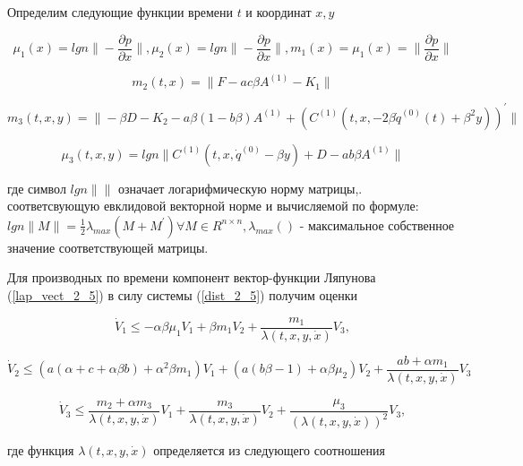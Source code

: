 Определим следующие функции времени $t$ и координат $x, y$

\begin{equation}
\mu_1 (x) = lgn \| - \frac{\partial p}{\partial x} \|, \mu_2 (x) = lgn \| - \frac{\partial p}{\partial x} \|, m_1(x) = \mu_1 (x) = \|\frac{\partial p}{\partial x} \|
\end{equation}

\begin{equation}
m_2(t, x) = \| F - a c \beta A^{(1)} - K_1 \|
\end{equation}

\begin{equation}
m_3(t, x, y) = \| - \beta D - K_2 - a \beta (1 - b \beta) A^{(1)} + (C^{(1)}(t, x, - 2 \beta \dot q^{(0)}(t) + \beta^2 y))^{'} \|
\end{equation}

\begin{equation}
\mu_3 (t, x, y) = lgn \| C^{(1)} (t, x, \dot q^{(0)} - \beta y) + D - a b \beta A^{(1)} \|
\end{equation}

где символ $lgn \| \|$ означает логарифмическую норму матрицы,. соответсвующую евклидовой векторной норме и вычисляемой по формуле: $lgn \| M \| = \frac12 \lambda_{max} (M + M^{'}) \forall M \in R^{n \times n}, \lambda_{max} ()$ - максимальное собственное значение соответствующей матрицы.

Для производных по времени компонент вектор-функции Ляпунова (\ref{lap_vect_2_5}) в силу системы (\ref{dist_2_5}) получим оценки 

\begin{equation}
\dot V_1 \le - \alpha \beta \mu_1 V_1 + \beta m_1 V_2 + \frac{m_1}{\lambda (t, x, y, \dot x)} V_3, \label{lap_eq_1}
\end{equation}

\begin{equation}
\dot V_2 \le (a (\alpha + c + \alpha \beta b) + \alpha^2 \beta m_1) V_1 + (a (b \beta - 1) + \alpha \beta \mu_2) V_2 + \frac{a b + \alpha m_1}{\lambda(t, x, y, \dot x)} V_3 \label{lap_eq_2}
\end{equation}

\begin{equation}
\dot V_3 \le \frac{m_2 + \alpha m_3}{\lambda(t, x, y, \dot x)} V_1 + \frac{m_3}{\lambda(t, x, y, \dot x)} V_2 + \frac{\mu_3}{(\lambda(t, x, y, \dot x))^2} V_3, \label{lap_eq_3}
\end{equation}

где функция $\lambda(t, x, y, \dot x)$ определяется из следующего соотношения

